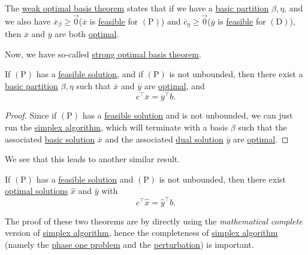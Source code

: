 \begin{prev}
	The \hyperref[thm:weak-optimal-basis-theorem]{weak optimal basis theorem} states that if we have a \hyperref[def:basic-partition]{basic partition} \(\beta, \eta\), and we also have \(\overline{x}_{\beta}\geq \vec{0}\)(\(\overline{x}\) is \hyperref[def:feasible-solution]{feasible} for \((\mathrm{P})\)) and \(\overline{c}_{\eta} \geq \vec{0}\)(\(\overline{y}\) is \hyperref[def:feasible-solution]{feasible} for \((\mathrm{D})\)), then \(\overline{x}\) and \(\overline{y}\) are both \hyperref[def:optimal-solution]{optimal}.
\end{prev}

Now, we have so-called \hyperref[thm:strong-optimal-basis]{strong optimal basis theorem}.

\begin{theorem}\label{thm:strong-optimal-basis}
	If \((\mathrm{P})\) has a \hyperref[def:feasible-solution]{feasible solution}, and if \((\mathrm{P})\) is not unbounded, then there exist a \hyperref[def:basic-partition]{basic partition} \(\beta, \eta\) such that \(\overline{x}\) and \(\overline{y}\) are \hyperref[def:optimal-solution]{optimal}, and
	\[
		c^{\top} \overline{x} = \overline{y}^{\top} b.
	\]
\end{theorem}
\begin{proof}
	Since if \((\mathrm{P})\) has a \hyperref[def:feasible-solution]{feasible solution} and is not unbounded, we can just run the \hyperref[algo:simplex-algorithm]{simplex algorithm}, which will terminate with a basis \(\beta\) such that the associated \hyperref[def:basic-solution]{basic solution} \(\overline{x}\) and the associated \hyperref[def:dual-basic-solution]{dual solution} \(\overline{y}\) are \hyperref[def:optimal-solution]{optimal}.
\end{proof}

We see that this leads to another similar result.

\begin{theorem}\label{thm:strong-duality}
	If \((\mathrm{P})\) has a \hyperref[def:feasible-solution]{feasible solution} and \((\mathrm{P})\) is not unbounded, then there exist \hyperref[def:optimal-solution]{optimal solutions} \(\hat{x}\) and \(\hat{y}\) with
	\[
		c^{\top} \hat{x} = \hat{y}^{\top} b.
	\]
\end{theorem}

\begin{note}
	The proof of these two theorems are by directly using the \emph{mathematical complete} version of \hyperref[algo:simplex-algorithm]{simplex algorithm}, hence the completeness of \hyperref[algo:simplex-algorithm]{simplex algorithm} (namely the \hyperref[def:phase-one-problem]{phase one problem} and the \hyperref[def:perturbed-problem]{perturbation}) is important.
\end{note}

